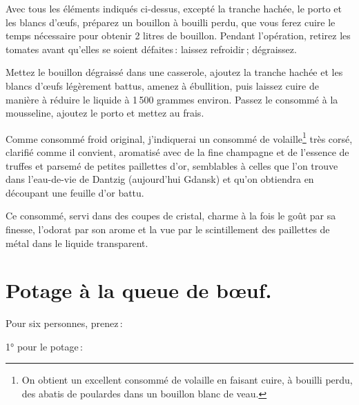 Avec tous les éléments indiqués ci-dessus, excepté la tranche hachée, le porto
et les blancs d'œufs, préparez un bouillon à bouilli perdu, que vous ferez
cuire le temps nécessaire pour obtenir 2 litres de bouillon. Pendant
l'opération, retirez les tomates avant qu'elles se soient défaites : laissez
refroidir ; dégraissez.

Mettez le bouillon dégraissé dans une casserole, ajoutez la tranche hachée et
les blancs d'œufs légèrement battus, amenez à ébullition, puis laissez cuire de
manière à réduire le liquide à 1 500 grammes environ. Passez le consommé à la
mousseline, ajoutez le porto et mettez au frais.

\sk

Comme consommé froid original, j'indiquerai un consommé de volaille\footnote{On
obtient un excellent consommé de volaille en faisant cuire, à bouilli perdu,
des abatis de poulardes dans un bouillon blanc de veau.} très corsé, clarifié
comme il convient, aromatisé avec de la fine champagne et de l'essence de
truffes et parsemé de petites paillettes d’or, semblables à celles que l'on
trouve dans l'eau-de-vie de Dantzig (aujourd'hui Gdansk) et qu'on obtiendra en
découpant une feuille d'or battu.

Ce consommé, servi dans des coupes de cristal, charme à la fois le goût par sa
finesse, l'odorat par son arome et la vue par le scintillement des paillettes
de métal dans le liquide transparent.

\section*{\centering Potage à la queue de bœuf.}

Pour six personnes, prenez :

\medskip

1° pour le potage :

